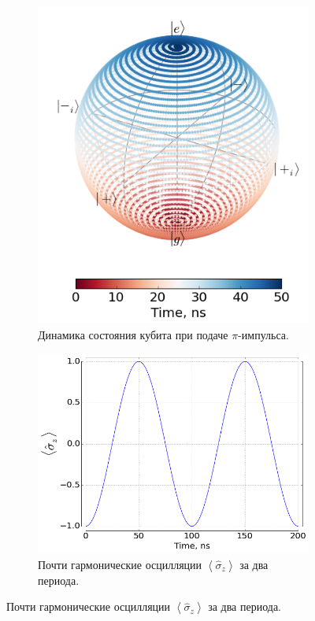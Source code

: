 \documentclass[12pt, twoside]{report}
\numberwithin{equation}{section}
\numberwithin{figure}{section}
\begin{document}
\begin{figure}[h!]
\begin{subfigure}[t]{0.4\textwidth}
\centering
\includegraphics[height=0.225\textheight]{Pictures/rabi_dynamics_bloch2}
\caption{Динамика состояния кубита при подаче $\pi$-импульса.}
\end{subfigure}\quad
\begin{subfigure}[t]{0.5\textwidth}
\centering
\includegraphics[height=0.225\textheight]{Pictures/rabi_dynamics_sz2}
\caption{Почти гармонические осцилляции $\left< \hat\sigma_z \right>$ за два периода.}
\end{subfigure}


\end{figure}
\end{document}
